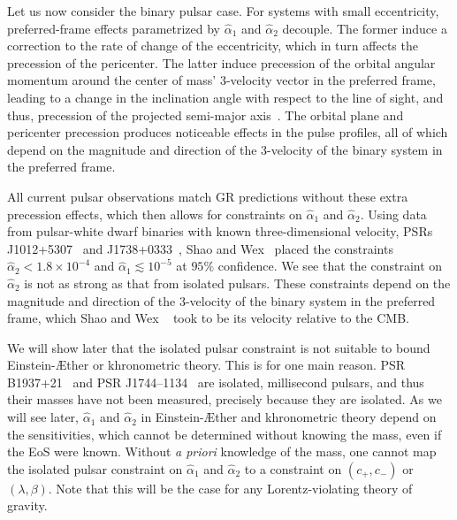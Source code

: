 \documentclass[prd,aps,twocolumn,nofootinbib,showpacs,superscriptaddress]{revtex4-1}
\begin{document}
Let us now consider the binary pulsar case. For systems with small eccentricity, preferred-frame effects parametrized by $\hat{\alpha}_{1}$ and $\hat{\alpha}_{2}$ decouple. The former induce a correction to the rate of change of the eccentricity, which in turn affects the precession of the pericenter. The latter induce precession of the orbital angular momentum around the center of mass' 3-velocity vector in the  preferred frame, leading to a change in the inclination angle with respect to the line of sight, and thus, precession of the projected semi-major axis~\cite{stairs}.  The orbital plane and pericenter precession produces noticeable effects in the pulse profiles, all of which depend on the magnitude and direction of the 3-velocity of the binary system in the preferred frame.

All current pulsar observations match GR predictions without these extra precession effects, which then allows for constraints on $\hat{\alpha}_{1}$ and $\hat{\alpha}_{2}$. Using data from pulsar-white dwarf binaries with known three-dimensional velocity, PSRs J1012+5307~\cite{Tauris:1994id} and J1738+0333~\cite{freire}, Shao and Wex~\cite{Shao:2012eg} placed the constraints $\hat{\alpha}_{2} < 1.8 \times 10^{-4}$ and $\hat{\alpha}_{1} \lesssim 10^{-5}$ at $95\%$ confidence. We see that the constraint on $\hat{\alpha}_{2}$ is not as strong as that from isolated pulsars. These constraints  depend on the magnitude and direction of the 3-velocity of the binary system in the preferred frame, which Shao and Wex ~\cite{Shao:2012eg} took to be its velocity relative to the CMB.

We will show later that the isolated pulsar constraint is not suitable to bound Einstein-\AE ther or khronometric theory. This is for one main reason. PSR B1937+21~\cite{Rutledge:2003xk} and PSR J1744--1134~\cite{1997ApJ...481..386B} are isolated, millisecond pulsars, and thus their masses have not been measured, precisely because they are isolated. As we will see later, $\hat{\alpha}_{1}$ and $\hat{\alpha}_{2}$ in Einstein-\AE ther and khronometric theory depend on the sensitivities, which cannot be determined without knowing the mass, even if the EoS were known. Without {\textit{a priori}} knowledge of the mass, one cannot map the isolated pulsar constraint on $\hat{\alpha}_{1}$ and $\hat{\alpha}_{2}$ to a constraint on $(c_{+},c_{-})$ or $(\lambda,\beta)$. Note that this will be the case for any Lorentz-violating theory of gravity.

\end{document}
